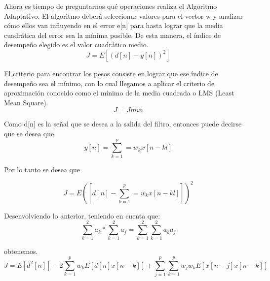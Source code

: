 \begin{itemize}
Ahora es tiempo de preguntarnos qué operaciones realiza el Algoritmo Adaptativo. El algoritmo deberá seleccionar valores para el vector w y analizar cómo ellos van influyendo en el error e[n] para hasta lograr que la media cuadrática del error sea la mínima posible. De esta manera, el índice de desempeño elegido es el valor cuadrático medio.\\

\begin{equation} \label{capcuatro_treintacinco}
	 J=E[(d[n]-y[n])^{2}]
\end{equation}

El criterio para encontrar los pesos consiste en lograr que ese índice de desempeño sea el mínimo, con lo cual llegamos a aplicar el criterio de aproximación conocido como el mínimo de la media cuadrada o LMS (Least Mean Square).\\

\begin{equation} \label{capcuatro_treintasies}
	J=Jmin
\end{equation}

Como d[n] es la señal que se desea a la salida del filtro, entonces puede decirse que se desea que. \\

\begin{equation} \label{capcuatro_treintasiete}
	y[n]= \sum_{k=1}^{p}=  w_{k}x[n-kl]
\end{equation}

Por lo tanto se desea que

\begin{equation} \label{capcuatro_treintaocho}
	J= E \left([d[n]-\sum_{k=1}^{p}=  w_{k}x[n-kl]]\right)^{2}
\end{equation}

Desenvolviendo lo anterior, teniendo en cuenta que: \\


\begin{equation} \label{capcuatro_treintanueve}
	\sum_{k=1}^{2}a_{k} * \sum_{k=1}^{2}a_{j} = \sum_{k=1}^{2}\sum_{k=1}^{2}a_{k}a_{j}
\end{equation}



obtenemos. \\

\begin{equation} \label{capcuatro_cuarenta}
	J= E [d^{2}[n]]-2  \sum_{k=1}^{p}w_{k}E [d[n]x[n-k]]+ \sum_{j=1}^{p} \sum_{k=1}^{p} w_{j} w_{k} E[x[n-j]x[n-k]]
\end{equation}
\end{itemize}


